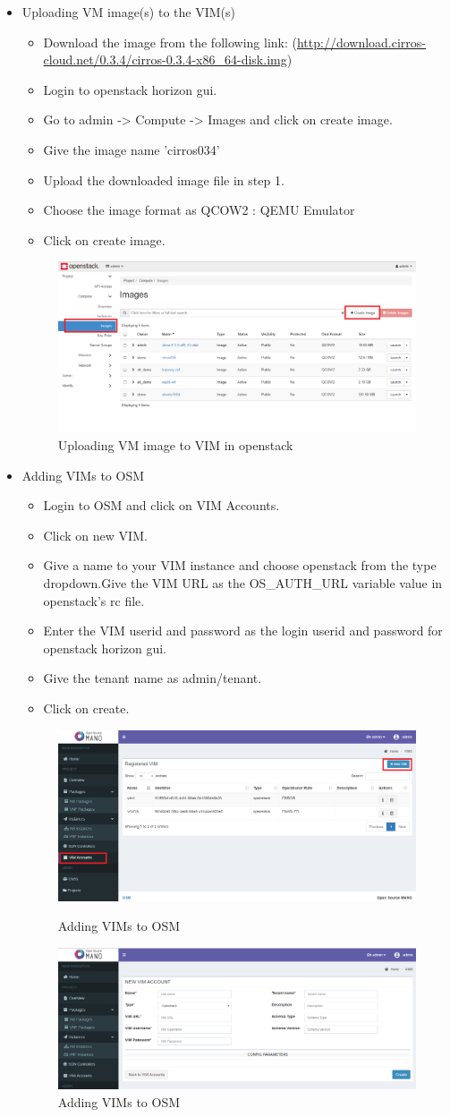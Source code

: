 \begin{itemize}
\item Uploading VM image(s) to the VIM(s)
\begin{itemize}
\item Download the image from the following link: (\hyperlink{name}{http://download.cirros-cloud.net/0.3.4/cirros-0.3.4-x86_64-disk.img})
\item Login to openstack horizon gui.
\item Go to admin -> Compute -> Images and click on create image.
\item Give the image name 'cirros034'
\item Upload the downloaded image file in step 1.
\item Choose the image format as QCOW2 : QEMU Emulator
\item Click on create image.
\end{itemize}
\begin{figure} [h]
	\centering
	\includegraphics[width=0.5\linewidth]{figures/sh8}
	\caption{Uploading VM image to VIM in openstack}
\end{figure}
\item Adding VIMs to OSM
\begin{itemize}
\item Login to OSM and click on VIM Accounts.
\item Click on new VIM.
\item Give a name to your VIM instance and choose openstack from the type dropdown.Give the VIM URL as the OS\_AUTH\_URL variable value in openstack's rc file.
\item Enter the VIM userid and password as the login userid and password for openstack horizon gui.
\item Give the tenant name as admin/tenant.
\item Click on create.
\end{itemize}
\begin{figure} [h]
	\centering
	\includegraphics[width=0.5\linewidth]{figures/sh6}
	\caption{Adding VIMs to OSM}
	\includegraphics[width=0.5\linewidth]{figures/sh7}
	\caption{Adding VIMs to OSM}
\end{figure}
\end{itemize}
\newpage
